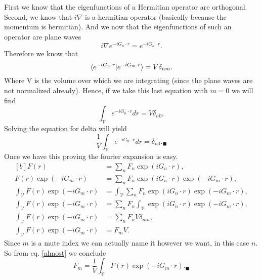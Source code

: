 \begin{questions}
\begin{solution}
  First we know that the eigenfunctions of a Hermitian operator are orthogonal. Second, we know that $i\nabla$ is a hermitian operator (basically because the momentum is hermitian). And we now that the eigenfunctions of such an operator are plane waves
  \begin{equation}
    i\nabla e^{-iG_n\cdot r} = e^{-iG_n\cdot r}.
  \end{equation}
  Therefore we know that
  \begin{equation}
    \braket{e^{-iG_n\cdot r}|e^{-iG_m\cdot r}} = V\delta_{nm}.
  \end{equation}
  Where V is the volume over which we are integrating (since the plane waves are not normalized already).
  Hence, if we take this last equation with $m= 0$ we will find
  \begin{equation}
    \int_{\mathcal{V}} e^{-iG_n\cdot r}dr = V\delta_{n0},
  \end{equation}
  Solving the equation for delta will yield
  \begin{equation}
    \frac{1}{V}\int_{\mathcal{V}} e^{-iG_n\cdot r}dr =\delta_{n0}. _\blacksquare
  \end{equation}
  Once we have this proving the fourier expansion is easy.
  \begin{equation}
    \begin{aligned}[b]
      F(r) &= \sum_n F_n\exp{(iG_n\cdot r)},\\
      F(r)\exp{(-iG_m\cdot r)} &= \sum_n F_n\exp{(iG_n\cdot r)}\exp{(-iG_m\cdot r)},\\
      \int_{\mathcal{V}}F(r)\exp{(-iG_m\cdot r)} &= \int_{\mathcal{V}}\sum_n  F_n\exp{(iG_n\cdot r)}\exp{(-iG_m\cdot r)},      \\
      \int_{\mathcal{V}}F(r)\exp{(-iG_m\cdot r)} &= \sum_n  F_n\int_{\mathcal{V}}\exp{(iG_n\cdot r)}\exp{(-iG_m\cdot r)}, \\
      \int_{\mathcal{V}}F(r)\exp{(-iG_m\cdot r)} &= \sum_n  F_nV\delta_{mn},\\
      \int_{\mathcal{V}}F(r)\exp{(-iG_m\cdot r)} &=   F_mV.
      \label{almost}
    \end{aligned}
  \end{equation}
  Since $m$ is a mute index we can actually name it however we want, in this case $n$.   So from eq. \ref{almost} we conclude
  \begin{equation}
    F_m = \frac{1}{V}\int_{\mathcal{V}}F(r)\exp{(-iG_m\cdot r)}._\blacksquare

\end{equation}
\end{solution}
\end{questions}
